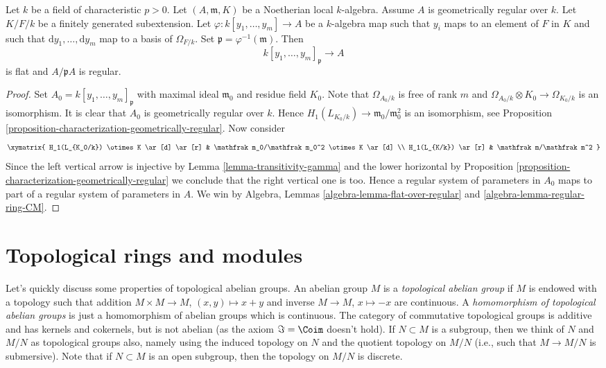 \begin{lemma}
\label{lemma-geometrically-regular-over-field}
Let $k$ be a field of characteristic $p > 0$. Let $(A, \mathfrak m, K)$
be a Noetherian local $k$-algebra. Assume $A$ is geometrically regular
over $k$. Let $K/F/k$ be a finitely generated subextension.
Let $\varphi : k[y_1, \ldots, y_m] \to A$ be a $k$-algebra map
such that $y_i$ maps to an element of $F$ in $K$ and such that
$\text{d}y_1, \ldots, \text{d}y_m$ map to a basis of $\Omega_{F/k}$.
Set $\mathfrak p = \varphi^{-1}(\mathfrak m)$. Then
$$
k[y_1, \ldots, y_m]_\mathfrak p \to A
$$
is flat and $A/\mathfrak pA$ is regular.
\end{lemma}

\begin{proof}
Set $A_0 = k[y_1, \ldots, y_m]_\mathfrak p$ with maximal ideal
$\mathfrak m_0$ and residue field $K_0$. Note that
$\Omega_{A_0/k}$ is free of rank $m$ and
$\Omega_{A_0/k} \otimes K_0 \to \Omega_{K_0/k}$ is an isomorphism.
It is clear that $A_0$ is geometrically regular over $k$. Hence
$H_1(L_{K_0/k}) \to \mathfrak m_0/\mathfrak m_0^2$ is an isomorphism, see
Proposition \ref{proposition-characterization-geometrically-regular}.
Now consider
$$
\xymatrix{
H_1(L_{K_0/k}) \otimes K \ar[d] \ar[r] &
\mathfrak m_0/\mathfrak m_0^2 \otimes K \ar[d] \\
H_1(L_{K/k}) \ar[r] & \mathfrak m/\mathfrak m^2
}
$$
Since the left vertical arrow is injective by
Lemma \ref{lemma-transitivity-gamma}
and the lower horizontal by
Proposition \ref{proposition-characterization-geometrically-regular}
we conclude that the right vertical one is too.
Hence a regular system of parameters in $A_0$ maps to
part of a regular system of parameters in $A$.
We win by
Algebra, Lemmas \ref{algebra-lemma-flat-over-regular} and
\ref{algebra-lemma-regular-ring-CM}.
\end{proof}












\section{Topological rings and modules}
\label{section-topological-ring}

\noindent
Let's quickly discuss some properties of topological abelian groups.
An abelian group $M$ is a {\it topological abelian group} if $M$ is
endowed with a topology such that addition $M \times M \to M$,
$(x, y) \mapsto x + y$ and inverse $M \to M$, $x \mapsto -x$ are
continuous. A {\it homomorphism of topological abelian groups}
is just a homomorphism of abelian groups which is continuous.
The category of commutative topological groups is additive and
has kernels and cokernels, but is not abelian (as the axiom
$\Im = \Coim$ doesn't hold). If $N \subset M$ is a
subgroup, then we think of $N$ and $M/N$ as topological groups
also, namely using the induced topology on $N$ and the quotient
topology on $M/N$ (i.e., such that $M \to M/N$ is submersive).
Note that if $N \subset M$ is an open subgroup, then the topology
on $M/N$ is discrete.

